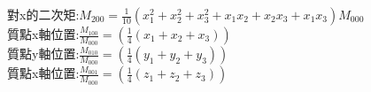 \begin{itemize}
對x的二次矩:$M_{200} = \frac{1}{10}(x_1^{2} + x_2^{2} + x_3^{2} + x_1 x_2 + x_2 x_3 + x_1 x_3 ) M_{000} $\\

質點x軸位置:$\frac{M_{100}}{M_{000}} = (\frac{1}{4}(x_1 + x_2 + x_3)) $\\

質點y軸位置:$\frac{M_{010}}{M_{000}} = (\frac{1}{4}(y_1 + y_2 + y_3)) $\\

質點x軸位置:$\frac{M_{001}}{M_{000}} = (\frac{1}{4}(z_1 + z_2 + z_3)) $\\


\end{itemize}